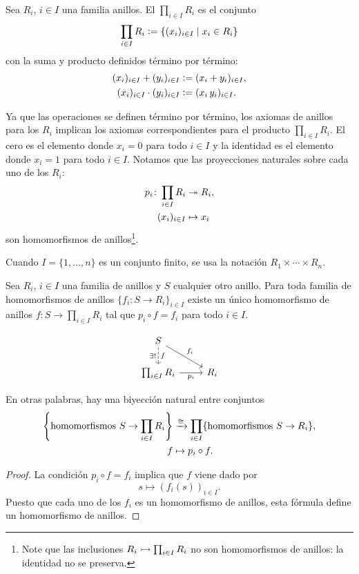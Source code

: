 \begin{definicion}
  Sea $R_i$, $i\in I$ una familia anillos.
  El  $\prod_{i\in I} R_i$
  es el conjunto
  $$\prod_{i\in I} R_i \mathrel{\mathop:}= \{ (x_i)_{i\in I} \mid x_i \in R_i \}$$
  con la suma y producto definidos término por término:
  \begin{align*}
    (x_i)_{i\in I} + (y_i)_{i\in I} & \mathrel{\mathop:}= (x_i + y_i)_{i\in I},\\
    (x_i)_{i\in I} \cdot (y_i)_{i\in I} & \mathrel{\mathop:}= (x_i\,y_i)_{i\in I}.
  \end{align*}
\end{definicion}

Ya que las operaciones se definen término por término, los axiomas de anillos
para los $R_i$ implican los axiomas correspondientes para el producto
$\prod_{i\in I} R_i$. El cero es el elemento donde $x_i = 0$ para todo $i\in I$
y la identidad es el elemento donde $x_i = 1$ para todo $i\in I$. Notamos
que las proyecciones naturales sobre cada uno de los $R_i$:
\begin{align*}
  p_i\colon \prod_{i\in I} R_i & \twoheadrightarrow R_i,\\
  (x_i)_{i\in I} & \mapsto x_i
\end{align*}
son homomorfismos de anillos\footnote{Note que las inclusiones
  $R_i \rightarrowtail \prod_{i\in I} R_i$ no son homomorfismos de anillos: la identidad
  no se preserva.}.

Cuando $I = \{ 1, \ldots, n \}$ es un conjunto finito, se usa la notación
$R_1\times \cdots \times R_n$.

\begin{observacion}
  Sea $R_i$, $i\in I$ una familia de anillos y $S$ cualquier otro anillo.
  Para toda familia de homomorfismos de anillos
  $\{ f_i\colon S\to R_i \}_{i\in I}$ existe un único homomorfismo de anillos
  $f\colon S\to \prod_{i\in I} R_i$ tal que $p_i\circ f = f_i$ para todo
  $i\in I$.

  \[ \begin{tikzcd}
      S \ar[dashed]{d}{f}[swap]{\exists !}\ar{dr}{f_i} \\
      \prod_{i\in I} R_i \ar{r}[swap]{p_i} & R_i
    \end{tikzcd} \]

  En otras palabras, hay una biyección natural entre conjuntos
  \begin{align*}
    \left\{ \text{homomorfismos }S \to \prod_{i\in I} R_i \right\} & \xrightarrow{\cong}
    \prod_{i\in I} \{ \text{homomorfismos }S \to R_i \},\\
    f & \mapsto p_i\circ f.
  \end{align*}

  \begin{proof}
    La condición $p_i\circ f = f_i$ implica que $f$ viene dado por
    $$s \mapsto (f_i (s))_{i\in I}.$$
    Puesto que cada uno de los $f_i$ es un homomorfismo de anillos, esta fórmula
    define un homomorfismo de anillos.
  \end{proof}
\end{observacion}

